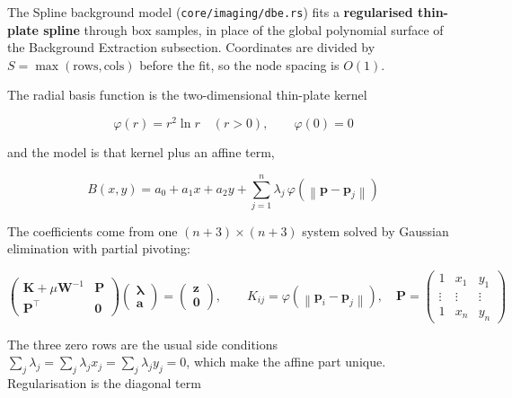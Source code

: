 \documentclass[11pt,a4paper]{article}
\newcommand{\code}[1]{\texttt{\small #1}}
\newcommand{\mat}[1]{\mathbf{#1}}
\begin{document}
    The Spline background model (\code{core/imaging/dbe.rs}) fits a \textbf{regularised thin-plate spline} through box samples, in place of the global polynomial surface of the Background Extraction subsection. Coordinates are divided by $S = \max(\text{rows}, \text{cols})$ before the fit, so the node spacing is $O(1)$.

    The radial basis function is the two-dimensional thin-plate kernel

    \begin{equation}
        \boxed{
            \varphi(r) = r^2 \ln r \quad (r > 0), \qquad \varphi(0) = 0
        }
    \end{equation}

    and the model is that kernel plus an affine term,

    \begin{equation}
        B(x, y) = a_0 + a_1 x + a_2 y + \sum_{j=1}^{n} \lambda_j \, \varphi\!\left(\left\| \mathbf{p} - \mathbf{p}_j \right\|\right)
    \end{equation}

    The coefficients come from one $(n+3) \times (n+3)$ system solved by Gaussian elimination with partial pivoting:

    \begin{equation}
        \begin{pmatrix}
            \mat{K} + \mu \mat{W}^{-1} & \mat{P} \\
            \mat{P}^{\!\top} & \mat{0}
        \end{pmatrix}
        \begin{pmatrix} \boldsymbol{\lambda} \\ \mathbf{a} \end{pmatrix}
        =
        \begin{pmatrix} \mathbf{z} \\ \mathbf{0} \end{pmatrix},
        \qquad
        K_{ij} = \varphi\!\left(\left\| \mathbf{p}_i - \mathbf{p}_j \right\|\right),
        \quad
        \mat{P} = \begin{pmatrix} 1 & x_1 & y_1 \\ \vdots & \vdots & \vdots \\ 1 & x_n & y_n \end{pmatrix}
    \end{equation}

    The three zero rows are the usual side conditions $\sum_j \lambda_j = \sum_j \lambda_j x_j = \sum_j \lambda_j y_j = 0$, which make the affine part unique. Regularisation is the diagonal term
\end{document}
